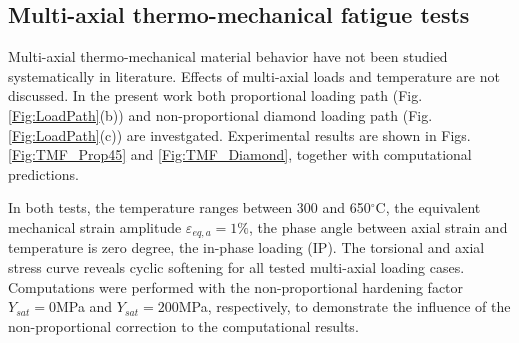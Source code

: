 \documentclass[preprint,5p,twocolumn,11pt,sort&compress]{elsarticle}
\begin{document}
\begin{figure*}[!htp]
\caption{Experimental and computational results under the proportional in-phase thermo-mechanical loading conditions with temperature of 300-650$^{\circ}$C. (a) The first loading cycle. (b) The half life loading cycle. (c) Axial peak-valley stresses as function of the loading cycles. (d) Torsional peak-valley stresses as function of the loading cycles.}
\label{Fig:TMF_Prop45}
\end{figure*}


\begin{figure*}
\caption{Experimental and computational results under the diamond strain path in-phase thermo-mechanical loading conditions with temperature of 300-650$^{\circ}$C. (a) The first loading cycle. (b) The half life loading cycle. (c) Axial peak-valley stresses as function of the loading cycles. (d) Torsional peak-valley stresses as function of the loading cycles.}
\label{Fig:TMF_Diamond}
\end{figure*}

\subsection{Multi-axial thermo-mechanical fatigue tests}
Multi-axial thermo-mechanical material behavior have not been studied systematically in literature. Effects of multi-axial loads and temperature are not discussed. In the present work both proportional loading path (Fig. \ref{Fig:LoadPath}(b)) and non-proportional diamond loading path (Fig. \ref{Fig:LoadPath}(c)) are investgated. Experimental results are shown in Figs. \ref{Fig:TMF_Prop45} and \ref{Fig:TMF_Diamond}, together with computational predictions.

In both tests, the temperature ranges between 300 and 650$^{\circ}$C, the equivalent mechanical strain amplitude $\varepsilon_{eq,a}=1\%$, the phase angle between axial strain and temperature is zero degree, the in-phase loading (IP).
The torsional and axial stress curve reveals cyclic softening for all tested multi-axial loading cases.
Computations were performed with the non-proportional hardening factor $Y_{sat}=0$MPa and $Y_{sat}=200$MPa, respectively, to demonstrate the influence of the non-proportional correction to the computational results.
\end{document}
